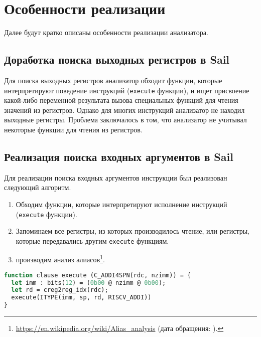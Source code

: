 
\section{Особенности реализации}

Далее будут кратко описаны особенности реализации анализатора.

\subsection{Доработка поиска выходных регистров в Sail}

Для поиска выходных регистров анализатор обходит функции, которые интерпретируют поведение инструкций (\texttt{execute} функции), и ищет присвоение какой-либо переменной результата вызова специальных функций для чтения значений из регистров.
Однако для многих инструкций анализатор не находил выходные регистры.
Проблема заключалось в том, что анализатор не учитывал некоторые функции для чтения из регистров.

\subsection{Реализация поиска входных аргументов в Sail}

Для реализации поиска входных аргументов инструкции был реализован следующий алгоритм.

\begin{enumerate}
      \item Обходим функции, которые интерпретируют исполнение инструкций (\texttt{execute} функции).
      \item Запоминаем все регистры, из которых производилось чтение, или регистры, которые передавались другим \texttt{execute} функциям.
      \item производим анализ алиасов\footnote{\url{https://en.wikipedia.org/wiki/Alias_analysis} (дата обращения: ).}.
\end{enumerate}

\begin{lstlisting}[caption={Пример функции, которая интерпретирует выполнение инструкции c.addi4spn}, language=Caml, frame=single, label=alias]
function clause execute (C_ADDI4SPN(rdc, nzimm)) = {
  let imm : bits(12) = (0b00 @ nzimm @ 0b00);
  let rd = creg2reg_idx(rdc);
  execute(ITYPE(imm, sp, rd, RISCV_ADDI))
}
\end{lstlisting}

